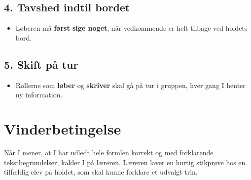 \documentclass[a4paper, 11pt]{article}
\begin{document}
\subsection*{4. Tavshed indtil bordet}
\label{sec:org89ee044}
\begin{itemize}
\item Løberen må \textbf{først sige noget}, når vedkommende er helt tilbage ved holdets bord.
\end{itemize}
\subsection*{5. Skift på tur}
\label{sec:orgfaa143c}
\begin{itemize}
\item Rollerne som \textbf{løber} og \textbf{skriver} skal gå på tur i gruppen, hver gang I henter ny information.
\end{itemize}
\section*{Vinderbetingelse}
\label{sec:org8d414f4}
Når I mener, at I har udledt hele formlen korrekt og med forklarende tekstbegrundelser, kalder I på læreren. Læreren laver en hurtig stikprøve hos en tilfældig elev på holdet, som skal kunne forklare et udvalgt trin.
\end{document}
